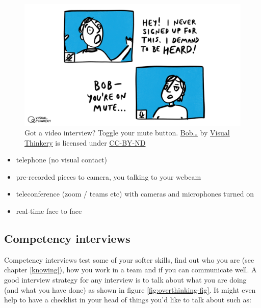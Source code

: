 \documentclass[
]{book}
\providecommand{\tightlist}{%
  \setlength{\itemsep}{0pt}\setlength{\parskip}{0pt}}
\begin{document}
\begin{figure}

{\centering \includegraphics[width=1\linewidth]{images/bob-youre-on-mute} 

}

\caption{Got a video interview? Toggle your mute button. \href{https://bryanmmathers.com/bob/}{Bob\ldots{}} by \href{https://visualthinkery.com/}{Visual Thinkery} is licensed under \href{https://creativecommons.org/licenses/by-nd/4.0/}{CC-BY-ND}}\label{fig:bobonmute-fig}
\end{figure}



\begin{itemize}
\tightlist
\item
  telephone (no visual contact)
\item
  pre-recorded pieces to camera, you talking to your webcam
\item
  teleconference (zoom / teams etc) with cameras and microphones turned on
\item
  real-time face to face
\end{itemize}

\hypertarget{hrinterview}{%
\subsection{Competency interviews}\label{hrinterview}}

Competency interviews test some of your softer skills, find out who you are (see chapter \ref{knowing}), how you work in a team and if you can communicate well. A good interview strategy for any interview is to talk about what you are doing (and what you have done) as shown in figure \ref{fig:overthinking-fig}. It might even help to have a checklist in your head of things you'd like to talk about such as:
\end{document}
